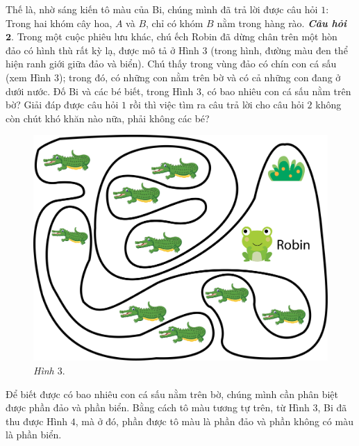 \begin{multicols}{2}
	\vskip 0.1cm
	Thế là, nhờ sáng kiến tô màu của Bi, chúng  mình đã trả lời được câu hỏi $1$: Trong hai khóm cây hoa, $A$ và $B$, chỉ có khóm $B$ nằm trong hàng rào.
	\vskip 0.1cm
	\textbf{\color{toancuabi}\textit{Câu hỏi $\pmb{2.}$}} Trong một cuộc phiêu lưu khác, chú ếch Robin đã dừng chân trên một hòn đảo có hình thù rất kỳ lạ, được mô tả ở Hình $3$ (trong hình, đường màu đen thể hiện ranh giới giữa đảo và biển). Chú thấy trong vùng đảo có chín con cá sấu (xem Hình $3$); trong đó, có những con nằm trên bờ và có cả những con đang ở dưới nước. Đố Bi và các bé biết, trong Hình $3$, có bao nhiêu con cá sấu nằm trên bờ?
	\vskip 0.1cm
	Giải đáp được câu hỏi $1$ rồi thì việc tìm ra câu trả lời cho câu hỏi $2$ không còn chút khó khăn nào nữa, phải không các bé?
	\begin{figure}[H]
		\centering
		\vspace*{-5pt}
		\captionsetup{labelformat= empty, justification=centering}
		\includegraphics[width=1\linewidth]{pic12}
		\caption{\small\textit{Hình $3.$}}
		\vspace*{-10pt}
	\end{figure}
	Để biết được có bao nhiêu con cá sấu nằm trên bờ, chúng mình cần phân biệt được phần đảo và phần biển. Bằng cách tô màu tương tự trên, từ Hình $3$, Bi đã thu được Hình $4$, mà ở đó, phần được tô màu là phần đảo và phần không có màu là phần biển.
	\begin{figure}[H]
		\centering
		\vspace*{-5pt}
		\captionsetup{labelformat= empty, justification=centering}

\end{figure}
\end{multicols}
